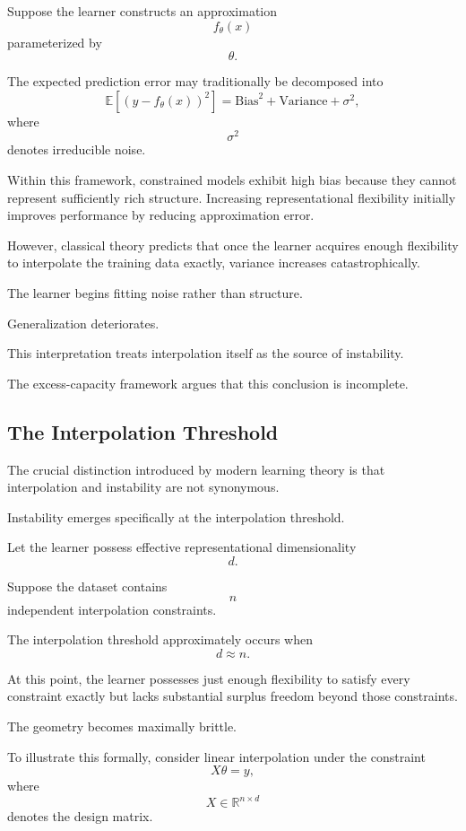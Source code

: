 \documentclass[12pt,a4paper]{article}
\begin{document}
Suppose the learner constructs an approximation
\[
f_\theta(x)
\]
parameterized by
\[
\theta.
\]

The expected prediction error may traditionally be decomposed into
\[
\mathbb{E}\left[(y - f_\theta(x))^2\right]
=
\text{Bias}^2
+
\text{Variance}
+
\sigma^2,
\]
where
\[
\sigma^2
\]
denotes irreducible noise.

Within this framework, constrained models exhibit high bias because they cannot represent sufficiently rich structure. Increasing representational flexibility initially improves performance by reducing approximation error.

However, classical theory predicts that once the learner acquires enough flexibility to interpolate the training data exactly, variance increases catastrophically.

The learner begins fitting noise rather than structure.

Generalization deteriorates.

This interpretation treats interpolation itself as the source of instability.

The excess-capacity framework argues that this conclusion is incomplete.

\subsection{The Interpolation Threshold}

The crucial distinction introduced by modern learning theory is that interpolation and instability are not synonymous.

Instability emerges specifically at the interpolation threshold.

Let the learner possess effective representational dimensionality
\[
d.
\]

Suppose the dataset contains
\[
n
\]
independent interpolation constraints.

The interpolation threshold approximately occurs when
\[
d \approx n.
\]

At this point, the learner possesses just enough flexibility to satisfy every constraint exactly but lacks substantial surplus freedom beyond those constraints.

The geometry becomes maximally brittle.

To illustrate this formally, consider linear interpolation under the constraint
\[
X\theta = y,
\]
where
\[
X \in \mathbb{R}^{n \times d}
\]
denotes the design matrix.
\end{document}
